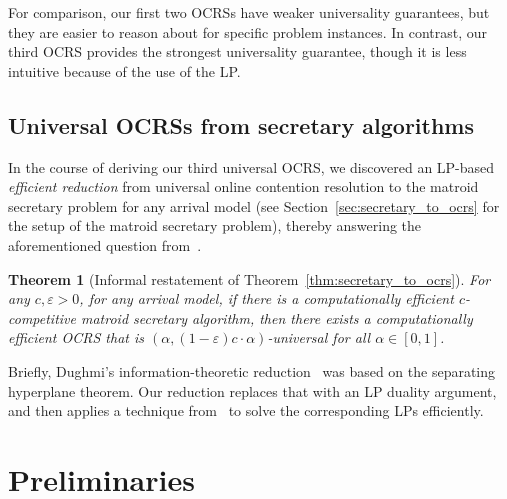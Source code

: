 \documentclass[11pt]{article}
\newcommand{\eps}{\varepsilon}
\newtheorem{theorem}{Theorem}[section]
\begin{document}
For comparison, our first two OCRSs have weaker universality guarantees, but they are easier to reason about for specific problem instances. In contrast, our third OCRS provides the strongest universality guarantee, though it is less intuitive because of the use of the LP.

\subsection{Universal OCRSs from secretary algorithms}
In the course of deriving our third universal OCRS, we discovered an LP-based \emph{efficient reduction} from universal online contention resolution to the matroid secretary problem for any arrival model (see Section~\ref{sec:secretary_to_ocrs} for the setup of the matroid secretary problem), thereby answering the aforementioned question from~\citet{dughmi2020outer}.
\begin{theorem}[Informal restatement of Theorem~\ref{thm:secretary_to_ocrs}]
For any $c,\eps>0$, for any arrival model, if there is a computationally efficient $c$-competitive matroid secretary algorithm, then there exists a computationally efficient OCRS that is $(\alpha,(1-\eps)c\cdot\alpha)$-universal for all $\alpha\in[0,1]$.
\end{theorem}
Briefly, Dughmi's information-theoretic reduction~\citep[Theorem 4.1]{dughmi2020outer} was based on the separating hyperplane theorem. Our reduction replaces that with an LP duality argument, and then applies a technique from~\citet{lee2018optimal} to solve the corresponding LPs efficiently. 
\section{Preliminaries}\label{sec:preliminary}
\end{document}
